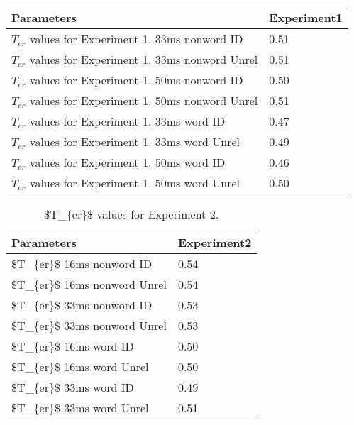 \documentclass[
  english,
  man,floatsintext]{apa6}
\begin{document}
\begin{appendix}
\begin{table}[tbp]
\begin{center}
\begin{threeparttable}
\begin{tabular}{ll}
\toprule
Parameters & \multicolumn{1}{c}{Experiment1}\\
\midrule
$T_{er}$ values for Experiment 1.  33ms nonword ID & 0.51\\
$T_{er}$ values for Experiment 1. 33ms nonword Unrel & 0.51\\
$T_{er}$ values for Experiment 1.  50ms nonword ID & 0.50\\
$T_{er}$ values for Experiment 1. 50ms nonword Unrel & 0.51\\
$T_{er}$ values for Experiment 1.  33ms word ID & 0.47\\
$T_{er}$ values for Experiment 1. 33ms word Unrel & 0.49\\
$T_{er}$ values for Experiment 1.  50ms word ID & 0.46\\
$T_{er}$ values for Experiment 1. 50ms word Unrel & 0.50\\
\bottomrule
\end{tabular}

\end{threeparttable}
\end{center}

\end{table}

\begin{table}[tbp]

\begin{center}
\begin{threeparttable}

\caption{\label{tab:appendix_table_3} \$T\_\{er\}\$ values for Experiment 2.}

\begin{tabular}{ll}
\toprule
Parameters & \multicolumn{1}{c}{Experiment2}\\
\midrule
\$T\_\{er\}\$ 16ms nonword ID & 0.54\\
\$T\_\{er\}\$ 16ms nonword Unrel & 0.54\\
\$T\_\{er\}\$ 33ms nonword ID & 0.53\\
\$T\_\{er\}\$ 33ms nonword Unrel & 0.53\\
\$T\_\{er\}\$ 16ms word ID & 0.50\\
\$T\_\{er\}\$ 16ms word Unrel & 0.50\\
\$T\_\{er\}\$ 33ms word ID & 0.49\\
\$T\_\{er\}\$ 33ms word Unrel & 0.51\\
\bottomrule
\end{tabular}

\end{threeparttable}
\end{center}


\end{table}
\end{appendix}
\end{document}

